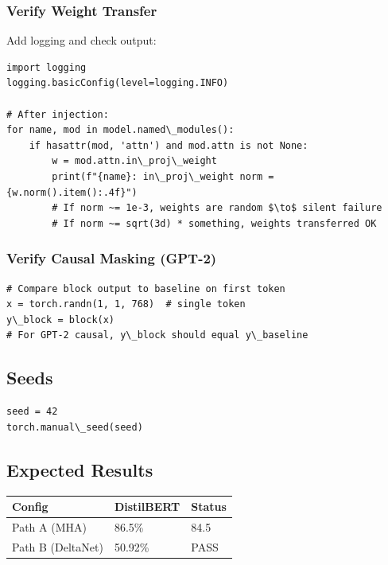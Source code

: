 \subsubsection{Verify Weight Transfer}

Add logging and check output:

\begin{lstlisting}
import logging
logging.basicConfig(level=logging.INFO)

# After injection:
for name, mod in model.named\_modules():
    if hasattr(mod, 'attn') and mod.attn is not None:
        w = mod.attn.in\_proj\_weight
        print(f"{name}: in\_proj\_weight norm = {w.norm().item():.4f}")
        # If norm ~= 1e-3, weights are random $\to$ silent failure
        # If norm ~= sqrt(3d) * something, weights transferred OK
\end{lstlisting}

\subsubsection{Verify Causal Masking (GPT-2)}

\begin{lstlisting}
# Compare block output to baseline on first token
x = torch.randn(1, 1, 768)  # single token
y\_block = block(x)
# For GPT-2 causal, y\_block should equal y\_baseline
\end{lstlisting}

\subsection{Seeds}

\begin{lstlisting}
seed = 42
torch.manual\_seed(seed)
\end{lstlisting}

\subsection{Expected Results}

\begin{table}[H]
\centering
\small
\begin{tabular}{lll}
\toprule
\textbf{Config} & \textbf{DistilBERT} & \textbf{Status} \\
\midrule
Path A (MHA) & 86.5\% & 84.5 \\
Path B (DeltaNet) & 50.92\% & PASS \\
\bottomrule
\end{tabular}
\end{table}

